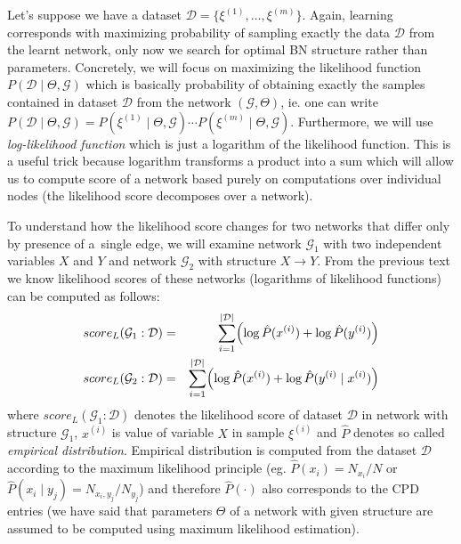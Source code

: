 \documentclass[english,cover]{fitthesis} %
\newcommand{\term}[1]{\emph{#1}}           %
\begin{document}
Let's suppose we have a dataset $\mathcal{D} = \lbrace \xi^{(1)}, \dots, \xi^{(m)} \rbrace$. Again, learning corresponds with maximizing probability of sampling exactly the data $\mathcal{D}$ from the learnt network, only now we search for optimal BN structure rather than parameters. Concretely, we will focus on maximizing the likelihood function $P(\mathcal{D} \mid \Theta, \mathcal{G})$ which is basically probability of obtaining exactly the samples contained in dataset $\mathcal{D}$ from the network $(\mathcal{G},\Theta)$, ie. one can write $P(\mathcal{D} \mid \Theta, \mathcal{G}) = P(\xi^{(1)} \mid \Theta, \mathcal{G}) \dotsm P(\xi^{(m)} \mid \Theta, \mathcal{G})$. Furthermore, we will use \term{log-likelihood function} which is just a logarithm of the likelihood function. This is a useful trick because logarithm transforms a product into a sum which will allow us to compute score of a network based purely on computations over individual nodes (the likelihood score decomposes over a network).

To understand how the likelihood score changes for two networks that differ only by presence of a~single edge, we will examine network $\mathcal{G}_1$ with two independent variables $X$ and $Y$ and network $\mathcal{G}_2$ with structure $X \rightarrow Y$. From the previous text we know likelihood scores of these networks (logarithms of likelihood functions) can be computed as follows:
\begin{eqnarray*}
    score_L(\mathcal{G}_1 : \mathcal{D}) & = & \sum_{i=1}^{|\mathcal{D}|} \Bigl(\log \hat P(x^{(i)}) + \log \hat P(y^{(i)})\Bigr)\\
    score_L(\mathcal{G}_2 : \mathcal{D}) & = & \sum_{i=1}^{|\mathcal{D}|} \Bigl(\log \hat P(x^{(i)}) + \log \hat P(y^{(i)} \mid x^{(i)})\Bigr)
\end{eqnarray*}
where $score_L(\mathcal{G}_1 : \mathcal{D})$ denotes the likelihood score of dataset $\mathcal{D}$ in network with structure $\mathcal{G}_1$, $x^{(i)}$ is value of variable $X$ in sample $\xi^{(i)}$ and $\hat P$ denotes so called \term{empirical distribution}. Empirical distribution is computed from the dataset $\mathcal{D}$ according to the maximum likelihood principle (eg. $\hat P(x_i) = N_{x_i} / N$ or $\hat P(x_i \mid y_j) = N_{x_i,y_j} / N_{y_j}$) and therefore $\hat{P}(\cdot)$ also corresponds to the CPD entries (we have said that parameters $\Theta$ of a network with given structure are assumed to be computed using maximum likelihood estimation).
\end{document}
